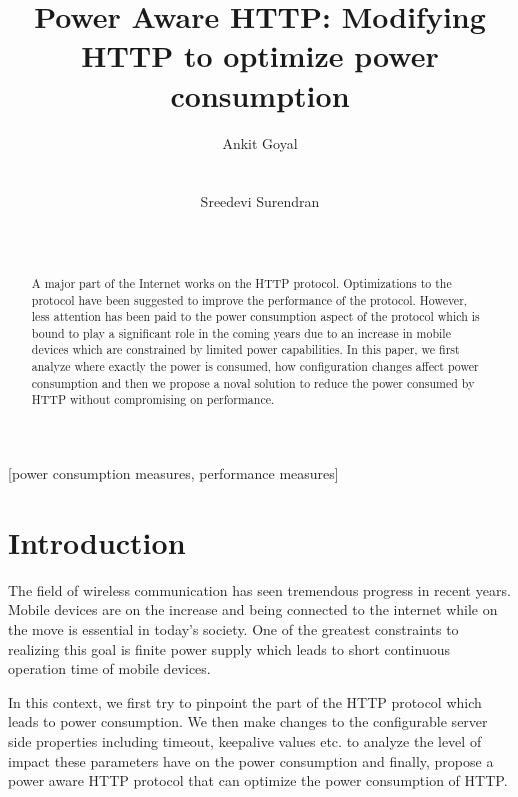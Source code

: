 \documentclass[9pt]{sigplan-proc-varsize}
\author{
%
\alignauthor Ankit Goyal\\
        \affaddr{Department of Computer Science}\\
        \affaddr{University of Texas at Austin}\\
       \email{ankitgoyal@utexas.edu}
\alignauthor Sreedevi Surendran \\
    \affaddr{Department of Computer Science}\\
    \affaddr{University of Texas at Austin}\\
    \email{sreedevi@cs.utexas.edu}
}
\title{Power Aware HTTP: Modifying HTTP to optimize power consumption}
\begin{document}
\setlength{\pdfpageheight}{\paperheight}
\setlength{\pdfpagewidth}{\paperwidth}


\maketitle


\begin{abstract}
\noindent A major part of the Internet works on the HTTP protocol. Optimizations to the protocol have been suggested to improve the performance of the protocol. However, less attention has been paid to the power consumption aspect of the protocol which is bound to play a significant role in the coming years due to an increase in mobile devices which are constrained by limited power capabilities. In this paper, we first analyze where exactly the power is consumed, how configuration changes affect power consumption and then we propose a noval solution to reduce the power consumed by HTTP without compromising on performance. 
\end{abstract} 

%
%

[power consumption measures,
performance measures]



\medskip

\section{Introduction}
  \label{sec:intro}

\medskip

The field of wireless communication has seen tremendous progress in recent years. Mobile devices are on the increase and being connected to the internet while on the move is essential in today’s society. One of the greatest constraints to realizing this goal is finite power supply which leads to short continuous operation time of mobile devices.

In this context, we first try to pinpoint the part of the HTTP protocol which leads to power consumption. We then make changes to the configurable server side properties including timeout, keepalive values etc. to analyze the level of impact these parameters have on the power consumption and finally, propose a power aware HTTP protocol that can optimize the power consumption of HTTP.
\end{document}
